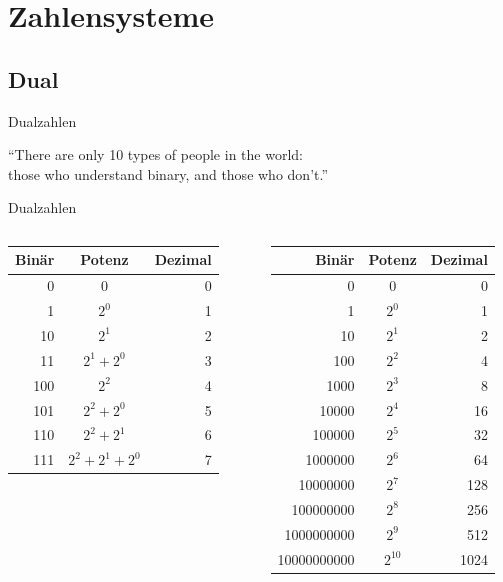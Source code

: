 \section{Zahlensysteme}

\subsection{Dual}
\begin{frame}{Dualzahlen}
  \begin{exampleblock}{}
    {\Large``There are only 10 types of people in the world:\\
    those who understand binary, and those who don't.''}\\[1em]
    \hspace*{}
  \end{exampleblock}
\end{frame}

\begin{frame}{Dualzahlen}
  \begin{columns}
    \begin{tabular}{r|c|r}
      \textbf{Binär} & \textbf{Potenz} & \textbf{Dezimal} \\ \hline
      0 & $0$ & 0 \\
      1 & $2^0$ & 1 \\
      10 & $2^1$ & 2 \\
      11 & $2^1+2^0$ & 3 \\
      100 & $2^2$ & 4 \\
      101 & $2^2+2^0$ & 5 \\
      110 & $2^2+2^1$ & 6 \\
      111 & $2^2+2^1+2^0$ & 7 \\
    \end{tabular}
    \begin{tabular}{r|c|r}
      \textbf{Binär} & \textbf{Potenz} & \textbf{Dezimal} \\ \hline
      0 & $0$ & 0 \\
      1 & $2^0$ & 1 \\
      10 & $2^1$ & 2 \\
      100 & $2^2$ & 4 \\
      1000 & $2^3$ & 8 \\
      10000 & $2^4$ & 16 \\
      100000 & $2^5$ & 32 \\
      1000000 & $2^6$ & 64 \\
      10000000 & $2^7$ & 128 \\
      100000000 & $2^8$ & 256 \\
      1000000000 & $2^9$ & 512 \\
      10000000000 & $2^{10}$ & 1024 \\
    \end{tabular}
  \end{columns}
\end{frame}

